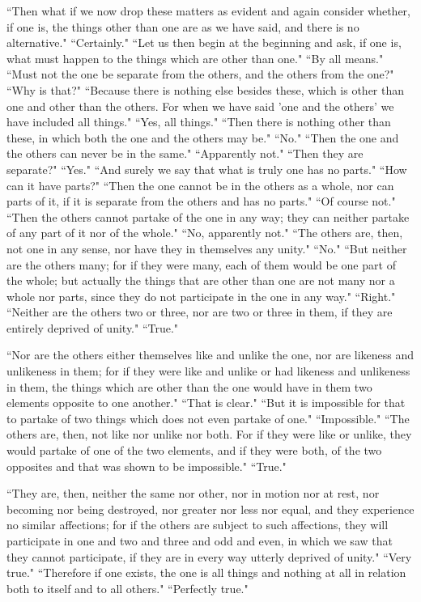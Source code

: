 \documentclass[letterpaper,12pt]{article}
\newcommand{\stephpag}[1]{\marginnote{\small\itshape\fontfamily{ppl}\selectfont #1}}
\begin{document}
``Then what if we now drop these matters as evident and again consider whether, if one is, the things other than one are as we have said, and there is no alternative." ``Certainly." ``Let us then begin at the beginning and ask, if one is, what must happen to the things which are other than one." ``By all means." ``Must not the one be separate from the others, and the others from the one?" ``Why is that?" ``Because there is nothing else besides these, \stephpag{c} which is other than one and other than the others. For when we have said 'one and the others' we have included all things." ``Yes, all things." ``Then there is nothing other than these, in which both the one and the others may be." ``No." ``Then the one and the others can never be in the same." ``Apparently not." ``Then they are separate?" ``Yes." ``And surely we say that what is truly one has no parts." ``How can it have parts?" ``Then the one cannot be in the others as a whole, nor can parts of it, if it is separate from the others and has no parts." ``Of course not." \stephpag{d} ``Then the others cannot partake of the one in any way; they can neither partake of any part of it nor of the whole." ``No, apparently not." ``The others are, then, not one in any sense, nor have they in themselves any unity." ``No." ``But neither are the others many; for if they were many, each of them would be one part of the whole; but actually the things that are other than one are not many nor a whole nor parts, since they do not participate in the one in any way." ``Right." ``Neither are the others two or three, nor are two or three in them, if they are entirely deprived of unity." \stephpag{e} ``True."

``Nor are the others either themselves like and unlike the one, nor are likeness and unlikeness in them; for if they were like and unlike or had likeness and unlikeness in them, the things which are other than the one would have in them two elements opposite to one another." ``That is clear." ``But it is impossible for that to partake of two things which does not even partake of one." ``Impossible." ``The others are, then, not like nor unlike nor both. \stephpag{160 a} For if they were like or unlike, they would partake of one of the two elements, and if they were both, of the two opposites and that was shown to be impossible." ``True."

``They are, then, neither the same nor other, nor in motion nor at rest, nor becoming nor being destroyed, nor greater nor less nor equal, and they experience no similar affections; for if the others are subject to such affections, they will participate in one and two and three and odd and even, \stephpag{b} in which we saw that they cannot participate, if they are in every way utterly deprived of unity." ``Very true." ``Therefore if one exists, the one is all things and nothing at all in relation both to itself and to all others." ``Perfectly true."
\end{document}
